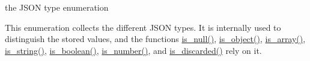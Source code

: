 the J\-S\-O\-N type enumeration 

This enumeration collects the different J\-S\-O\-N types. It is internally used to distinguish the stored values, and the functions \hyperlink{classnlohmann_1_1basic__json_a8abdfc0d6e051f6fa29d49da57bce631}{is\-\_\-null()}, \hyperlink{classnlohmann_1_1basic__json_a94ba313c00f1713fa4be85de64083754}{is\-\_\-object()}, \hyperlink{classnlohmann_1_1basic__json_a256a4cef002023acab3c9d75b569f54a}{is\-\_\-array()}, \hyperlink{classnlohmann_1_1basic__json_a409e854d754f5684b2cce74ee20dbc3b}{is\-\_\-string()}, \hyperlink{classnlohmann_1_1basic__json_adade77415e7f7bf08a9b5150c742714d}{is\-\_\-boolean()}, \hyperlink{classnlohmann_1_1basic__json_a957eb9594c7f0ca93212c30f3a400873}{is\-\_\-number()}, and \hyperlink{classnlohmann_1_1basic__json_a1002d187e05b5323bda5de124cbe95a8}{is\-\_\-discarded()} rely on it.

